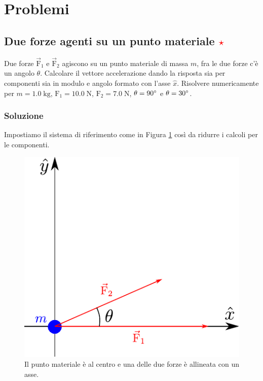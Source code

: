 \documentclass[12pt,a4paper]{book}
\newcommand{\rstar}{ \textcolor{red}{$\star$}}
\begin{document}
\section{Problemi}
\subsection{Due forze agenti su un punto materiale \rstar}
Due forze $\vec{\text{F}}_1$ e $\vec{\text{F}}_2$ agiscono su un punto materiale di massa $m$, fra le due forze c'è un angolo $\theta$. Calcolare il vettore accelerazione dando la risposta sia per componenti sia in modulo e angolo formato con l'asse $\hat{x}$. Risolvere numericamente per $m=1.0\;\text{kg}$, $\text{F}_1=10.0\;\text{N}$, $\text{F}_2=7.0\;\text{N}$,  $\theta=90\degree$ e $\theta=30\degree$.
 
\subsubsection*{Soluzione}
Impostiamo il sistema di riferimento come in Figura \ref{fig:4-p-1} così da ridurre i calcoli per le componenti. 

 \begin{figure}[!ht]
 \centering
\includegraphics[scale=0.8]{p-1.pdf}
\caption{Il punto materiale è al centro e una delle due forze è allineata con un asse.} 
\label{fig:4-p-1} 
\end{figure}
\end{document}
